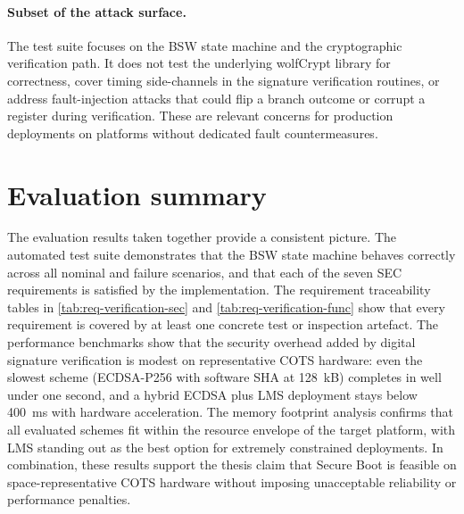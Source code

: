 \paragraph{Subset of the attack surface.}
The test suite focuses on the BSW state machine and the cryptographic verification path. It does not test the underlying wolfCrypt library for correctness, cover timing side-channels in the signature verification routines, or address fault-injection attacks that could flip a branch outcome or corrupt a register during verification. These are relevant concerns for production deployments on platforms without dedicated fault countermeasures.

\section{Evaluation summary}
\label{section:eval-summary}

The evaluation results taken together provide a consistent picture. The automated test suite demonstrates that the BSW state machine behaves correctly across all nominal and failure scenarios, and that each of the seven SEC requirements is satisfied by the implementation. The requirement traceability tables in \autoref{tab:req-verification-sec} and \autoref{tab:req-verification-func} show that every requirement is covered by at least one concrete test or inspection artefact. The performance benchmarks show that the security overhead added by digital signature verification is modest on representative COTS hardware: even the slowest scheme (ECDSA-P256 with software SHA at 128~kB) completes in well under one second, and a hybrid ECDSA plus LMS deployment stays below 400~ms with hardware acceleration. The memory footprint analysis confirms that all evaluated schemes fit within the resource envelope of the target platform, with LMS standing out as the best option for extremely constrained deployments. In combination, these results support the thesis claim that Secure Boot is feasible on space-representative COTS hardware without imposing unacceptable reliability or performance penalties.

